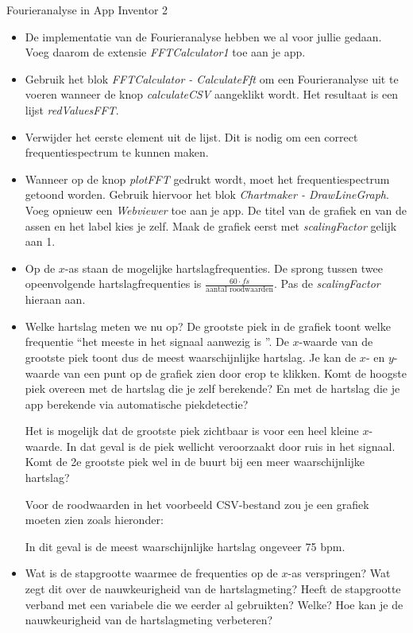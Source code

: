 \begin{opdracht}{Fourieranalyse in App Inventor 2}
\begin{itemize}
 	\item De implementatie van de Fourieranalyse hebben we al voor jullie gedaan. Voeg daarom de extensie \emph{FFTCalculator1} toe aan je app.
 	
	\item Gebruik het blok \emph{FFTCalculator - CalculateFft} om een Fourieranalyse uit te voeren wanneer de knop \emph{calculateCSV} aangeklikt wordt. Het resultaat is een lijst \emph{redValuesFFT}. 
	
	\item Verwijder het eerste element uit de lijst. Dit is nodig om een correct frequentiespectrum te kunnen maken.
	
	\item Wanneer op de knop \emph{plotFFT} gedrukt wordt, moet het frequentiespectrum getoond worden. Gebruik hiervoor het blok \emph{Chartmaker - DrawLineGraph}. Voeg opnieuw een \emph{Webviewer} toe aan je app. De titel van de grafiek en van de assen en het label kies je zelf. Maak de grafiek eerst met \emph{scalingFactor} gelijk aan 1.
	
	\item Op de $x$-as staan de mogelijke hartslagfrequenties. De sprong tussen twee opeenvolgende hartslagfrequenties is $\frac{60 \cdot fs}{\text{aantal roodwaarden}}$. Pas de \emph{scalingFactor} hieraan aan.

	
	\item Welke hartslag meten we nu op? De grootste piek in de grafiek toont welke frequentie \textquotedblleft het meeste in het signaal aanwezig is \textquotedblright. De $x$-waarde van de grootste piek toont dus de meest waarschijnlijke hartslag. Je kan de $x$- en $y$- waarde van een punt op de grafiek zien door erop te klikken. Komt de hoogste piek overeen met de hartslag die je zelf berekende? En met de hartslag die je app berekende via automatische piekdetectie?

	
	\begin{opmerking}
		Het is mogelijk dat de grootste piek zichtbaar is voor een heel kleine $x$-waarde. In dat geval is de piek wellicht veroorzaakt door ruis in het signaal. Komt de 2e grootste piek wel in de buurt bij een meer waarschijnlijke hartslag?
	\end{opmerking}

	Voor de roodwaarden in het voorbeeld CSV-bestand zou je een grafiek moeten zien zoals hieronder: 
	
	
	In dit geval is de meest waarschijnlijke hartslag ongeveer 75 bpm.
	
	\item Wat is de stapgrootte waarmee de frequenties op de $x$-as verspringen? Wat zegt dit over de nauwkeurigheid van de hartslagmeting? Heeft de stapgrootte verband met een variabele die we eerder al gebruikten? Welke? Hoe kan je de nauwkeurigheid van de hartslagmeting verbeteren?
\end{itemize}
\end{opdracht}






